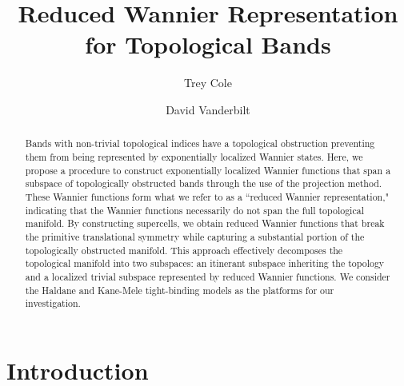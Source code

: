 \documentclass[galley,aps,pra,10pt,amsmath,amssymb,
    superscriptaddress,nofootinbib,longbibliography]{revtex4-2}
\begin{document}
\title{Reduced Wannier Representation for Topological Bands}

\author{Trey Cole}

\author{David Vanderbilt}

\begin{abstract}

Bands with non-trivial topological indices have a topological obstruction preventing them from being represented by exponentially localized Wannier states. Here, we propose a procedure to construct exponentially localized Wannier functions that span a subspace of topologically obstructed bands through the use of the projection method. These Wannier functions form what we refer to as a ``reduced Wannier representation," indicating that the Wannier functions necessarily do not span the full topological manifold. By constructing supercells, we obtain reduced Wannier functions that break the primitive translational symmetry while capturing a substantial portion of the topologically obstructed manifold. This approach effectively decomposes the topological manifold into two subspaces: an itinerant subspace inheriting the topology and a localized trivial subspace represented by reduced Wannier functions. We consider the Haldane and Kane-Mele tight-binding models as the platforms for our investigation.


\end{abstract}

\maketitle

\section{Introduction}
\end{document}
